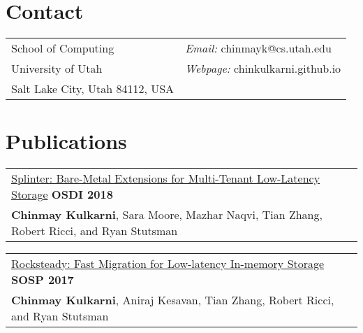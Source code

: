 \documentclass[margin,line]{res}
\begin{document}
\name{Chinmay Kulkarni\newline %
      {\small PhD Student, University of Utah}}
\begin{resume}
\section{\sc Contact}
 \begin{tabular}{@{}p{3.25in}p{4in}}
 School of Computing                             & {\it Email:  }  chinmayk@cs.utah.edu \\
 University of Utah                              & {\it Webpage:}  chinkulkarni.github.io \\
 Salt Lake City, Utah 84112, USA                 \\
 \end{tabular}


\section{\sc Publications}
 \vspace{-2.5pt}
 \begin{tabular}{@{}p{5.5in}p{4in}}
 \href{http://utah.systems/projects/kulkarni\_splinter}{Splinter:
 Bare-Metal Extensions for Multi-Tenant Low-Latency Storage} \hfill
 {\small\bf OSDI 2018}\\
 {\small{\bf Chinmay Kulkarni}, Sara Moore, Mazhar Naqvi, Tian Zhang, Robert
 Ricci, and Ryan Stutsman}\\
 \end{tabular}

 \vspace{-2.5pt}
 \begin{tabular}{@{}p{5.5in}p{4in}}
 \href{http://utah.systems/projects/kulkarni\_rocksteady}{Rocksteady: Fast
 Migration for Low-latency In-memory Storage} \hfill
 {\small\bf SOSP 2017}\\
 {\small{\bf Chinmay Kulkarni}, Aniraj Kesavan, Tian Zhang, Robert
 Ricci, and Ryan Stutsman}\\
 \end{tabular}


\end{resume}
\end{document}
